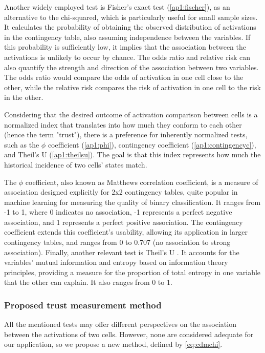 Another widely employed test is Fisher's exact test (\ref{ap1:fischer}), as an alternative to the chi-squared, which is particularly useful for small sample sizes. It calculates the probability of obtaining the observed distribution of activations in the contingency table, also assuming independence between the variables. If this probability is sufficiently low, it implies that the association between the activations is unlikely to occur by chance. The odds ratio and relative risk can also quantify the strength and direction of the association between two variables. The odds ratio would compare the odds of activation in one cell close to the other, while the relative risk compares the risk of activation in one cell to the risk in the other.

Considering that the desired outcome of activation comparison between cells is a normalized index that translates into how much they conform to each other (hence the term "trust"), there is a preference for inherently normalized tests, such as the $\phi$ coefficient (\ref{ap1:phi}), contingency coefficient (\ref{ap1:contingencyc}), and Theil's U (\ref{ap1:theilsu}). The goal is that this index represents how much the historical incidence of two cells' states match.

The $\phi$ coefficient, also known as Matthews correlation coefficient, is a measure of association designed explicitly for 2x2 contingency tables, quite popular in machine learning for measuring the quality of binary classification. It ranges from -1 to 1, where 0 indicates no association, -1 represents a perfect negative association, and 1 represents a perfect positive association. The contingency coefficient extends this coefficient's usability, allowing its application in larger contingency tables, and ranges from 0 to 0.707 (no association to strong association).
Finally, another relevant test is Theil's U . It accounts for the variables' mutual information and entropy based on information theory principles, providing a measure for the proportion of total entropy in one variable that the other can explain. It also ranges from 0 to 1.

\subsubsection{Proposed trust measurement method}

All the mentioned tests may offer different perspectives on the association between the activations of two cells. However, none are considered adequate for our application, so we propose a new method, defined by \ref{eq:cdmchi}.

